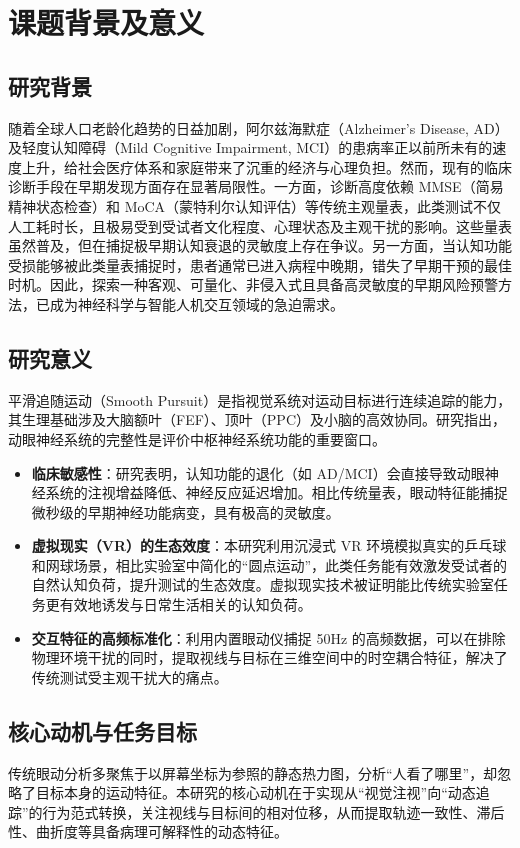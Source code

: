 \documentclass[12pt,hyperref,a4paper,UTF8]{ctexart}
\begin{document}
\section{课题背景及意义}
\subsection{研究背景}
随着全球人口老龄化趋势的日益加剧，阿尔兹海默症（Alzheimer's Disease, AD）及轻度认知障碍（Mild Cognitive Impairment, MCI）的患病率正以前所未有的速度上升，给社会医疗体系和家庭带来了沉重的经济与心理负担。然而，现有的临床诊断手段在早期发现方面存在显著局限性。一方面，诊断高度依赖 MMSE（简易精神状态检查）和 MoCA（蒙特利尔认知评估）等传统主观量表，此类测试不仅人工耗时长，且极易受到受试者文化程度、心理状态及主观干扰的影响。这些量表虽然普及，但在捕捉极早期认知衰退的灵敏度上存在争议\cite{folstein1975mini}。另一方面，当认知功能受损能够被此类量表捕捉时，患者通常已进入病程中晚期，错失了早期干预的最佳时机。因此，探索一种客观、可量化、非侵入式且具备高灵敏度的早期风险预警方法，已成为神经科学与智能人机交互领域的急迫需求。

\subsection{研究意义}
平滑追随运动（Smooth Pursuit）是指视觉系统对运动目标进行连续追踪的能力，其生理基础涉及大脑额叶（FEF）、顶叶（PPC）及小脑的高效协同。研究指出，动眼神经系统的完整性是评价中枢神经系统功能的重要窗口\cite{leigh2015neurology}。

\begin{itemize}
    \item \textbf{临床敏感性}：研究表明，认知功能的退化（如 AD/MCI）会直接导致动眼神经系统的注视增益降低、神经反应延迟增加。相比传统量表，眼动特征能捕捉微秒级的早期神经功能病变，具有极高的灵敏度。
    \item \textbf{虚拟现实（VR）的生态效度}：本研究利用沉浸式 VR 环境模拟真实的乒乓球和网球场景，相比实验室中简化的“圆点运动”，此类任务能有效激发受试者的自然认知负荷，提升测试的生态效度。虚拟现实技术被证明能比传统实验室任务更有效地诱发与日常生活相关的认知负荷\cite{parsons2015virtual}。
    \item \textbf{交互特征的高频标准化}：利用内置眼动仪捕捉 50Hz 的高频数据，可以在排除物理环境干扰的同时，提取视线与目标在三维空间中的时空耦合特征，解决了传统测试受主观干扰大的痛点。
\end{itemize}

\subsection{核心动机与任务目标}
传统眼动分析多聚焦于以屏幕坐标为参照的静态热力图，分析“人看了哪里”，却忽略了目标本身的运动特征。本研究的核心动机在于实现从“视觉注视”向“动态追踪”的行为范式转换，关注视线与目标间的相对位移，从而提取轨迹一致性、滞后性、曲折度等具备病理可解释性的动态特征。
\end{document}
